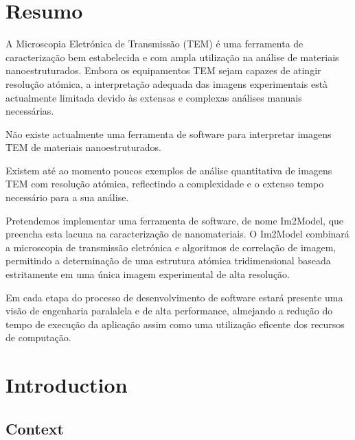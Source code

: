 \documentclass[
  oneside,
  11pt, a4paper,
  footinclude=true,
  headinclude=true,
  cleardoublepage=empty
]{scrbook}
\begin{document}
	
	
	\cleardoublepage
	\chapter*{Resumo}
	
	
	A  Microscopia Eletr\'{o}nica de Transmiss\~{a}o (TEM) \'{e} uma ferramenta de caracteriza\c{c}\~{a}o bem estabelecida e com ampla utiliza\c{c}\~{a}o na an\'{a}lise de materiais nanoestruturados. Embora os equipamentos  TEM sejam capazes de atingir resolu\c{c}\~{a}o at\'{o}mica, a interpreta\c{c}\~{a}o adequada das imagens experimentais est\`{a} actualmente limitada devido \`{a}s extensas e complexas an\'{a}lises manuais necess\'{a}rias.\par 
	N\~{a}o existe actualmente uma ferramenta de software para interpretar imagens TEM de materiais nanoestruturados.\par 
	Existem at\'{e} ao momento poucos exemplos de an\'{a}lise quantitativa de imagens TEM com resolu\c{c}\~{a}o at\'{o}mica, reflectindo a complexidade e o extenso tempo necess\'{a}rio para a sua an\'{a}lise.\par 
	Pretendemos implementar uma ferramenta de software, de nome Im2Model, que preencha esta lacuna na caracteriza\c{c}\~{a}o de nanomateriais. O Im2Model combinar\'{a} a microscopia de transmiss\~{a}o eletr\'{o}nica  e algoritmos de correla\c{c}\~{a}o de imagem, permitindo a determina\c{c}\~{a}o de uma estrutura at\'{o}mica tridimensional baseada estritamente em uma \'{u}nica imagem experimental de alta resolu\c{c}\~{a}o. 
	\par 
	
	
	Em cada etapa do processo de desenvolvimento de software estar\'{a} presente uma vis\~{a}o de  engenharia paralalela e de alta performance, almejando a redu\c{c}\~{a}o  do tempo de execu\c{c}\~{a}o da aplica\c{c}\~{a}o assim como uma utiliza\c{c}\~{a}o eficente dos recursos de computa\c{c}\~{a}o.
	
	\tableofcontents
	\listoffigures
	
	
	
	\chapter{Introduction}
	\section{Context}
	
\end{document}
